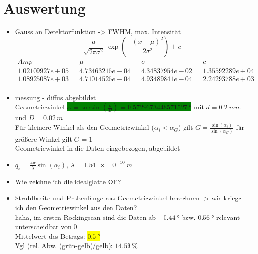 \section{Auswertung}
\begin{itemize}
	\item Gauss an Detektorfunktion -> FWHM, max. Intensität
	\begin{equation*}
		\frac{a}{\sqrt{2 \pi \sigma^2}} \, \exp{\left(-\frac{\left(x-\mu \right)^2}{2 \sigma^2}\right)}+c
	\end{equation*}
	\begin{align}
		Amp && \mu && \sigma && c \\
		1.02109927e+05 && 4.73463215e-04 && 4.34837954e-02 && 1.35592289e+04 \\
		1.08925087e+03 && 4.71014525e-04 && 4.93489841e-04 && 2.24293788e+03 \\
	\end{align}
	\item messung - diffus abgebildet\\
	Geometriewinkel \colorbox{green}{$\alpha = \arcsin{\left( \frac{d}{D}\right)} = \SI{0.5729673448571527}{°}$} mit $d=\SI{0.2}{mm}$ und $D=\SI{0.02}{m}$\\
	Für kleinere Winkel als den Geometriewinkel ($\alpha_i < \alpha_G$) gilt $G = \frac{\sin{(\alpha_i)}}{\sin{(\alpha_G)}}$ für größere Winkel gilt $G=1$\\
	Geometriewinkel in die Daten eingebezogen, abgebildet
	\item $q_z=\frac{4\pi}{\lambda}\sin{(\alpha_i)}$, $\lambda = \SI{1.54e-10}{m}$
	\item Wie zeichne ich die idealglatte OF?
	\item Strahlbreite und Probenlänge aus Geometriewinkel berechnen -> wie kriege ich den Geometriewinkel aus den Daten?\\
	haha, im ersten Rockingscan sind die Daten ab $\SI{-0.44}{°}$ bzw. $\SI{0.56}{°}$ relevant unterscheidbar von 0\\
	Mittelwert des Betrags: \colorbox{yellow}{$\SI{0.5}{°}$} \\
	Vgl (rel. Abw. (grün-gelb)/gelb): $\SI{14.59}{\%}$
\end{itemize}
